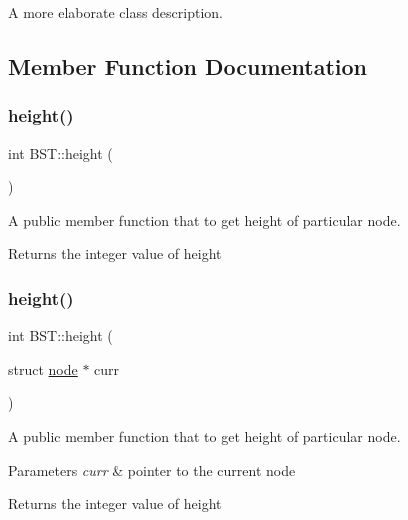 A more elaborate class description. 

\subsection{Member Function Documentation}
\mbox{\label{classBST_aa39f19e438fcc809abbf105bc0441952}} 
\subsubsection{\texorpdfstring{height()}{height()}\hspace{0.1cm}{\footnotesize\ttfamily [1/2]}}
{\footnotesize\ttfamily int B\+S\+T\+::height (\begin{DoxyParamCaption}{ }\end{DoxyParamCaption})\hspace{0.3cm}{\ttfamily [inline]}}



A public member function that to get height of particular node. 

\begin{DoxyReturn}{Returns}
the integer value of height 
\end{DoxyReturn}
\mbox{\label{classBST_a78398f0b59f1459c979fd364bdba5844}} 
\subsubsection{\texorpdfstring{height()}{height()}\hspace{0.1cm}{\footnotesize\ttfamily [2/2]}}
{\footnotesize\ttfamily int B\+S\+T\+::height (\begin{DoxyParamCaption}\item[{struct \hyperlink{structnode}{node} $\ast$}]{curr }\end{DoxyParamCaption})\hspace{0.3cm}{\ttfamily [protected]}}



A public member function that to get height of particular node. 


\begin{DoxyParams}{Parameters}
{\em curr} & pointer to the current node \\
\hline
\end{DoxyParams}
\begin{DoxyReturn}{Returns}
the integer value of height 
\end{DoxyReturn}
\mbox{\label{classBST_aba9736b7dae49342204347347f3008a9}} 
